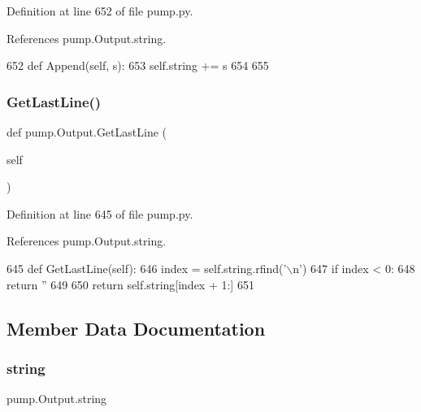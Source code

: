 Definition at line 652 of file pump.\+py.



References pump.\+Output.\+string.


\begin{DoxyCode}
652   \textcolor{keyword}{def }Append(self, s):
653     self.string += s
654 
655 
\end{DoxyCode}
\mbox{\label{classpump_1_1Output_a6ece94d24be171bae2a2234c052b4c58}} 
\subsubsection{\texorpdfstring{Get\+Last\+Line()}{GetLastLine()}}
{\footnotesize\ttfamily def pump.\+Output.\+Get\+Last\+Line (\begin{DoxyParamCaption}\item[{}]{self }\end{DoxyParamCaption})}



Definition at line 645 of file pump.\+py.



References pump.\+Output.\+string.


\begin{DoxyCode}
645   \textcolor{keyword}{def }GetLastLine(self):
646     index = self.string.rfind(\textcolor{stringliteral}{'\(\backslash\)n'})
647     \textcolor{keywordflow}{if} index < 0:
648       \textcolor{keywordflow}{return} \textcolor{stringliteral}{''}
649 
650     \textcolor{keywordflow}{return} self.string[index + 1:]
651 
\end{DoxyCode}


\subsection{Member Data Documentation}
\mbox{\label{classpump_1_1Output_a8786848ab3d235189379c449a446f883}} 
\subsubsection{\texorpdfstring{string}{string}}
{\footnotesize\ttfamily pump.\+Output.\+string}



